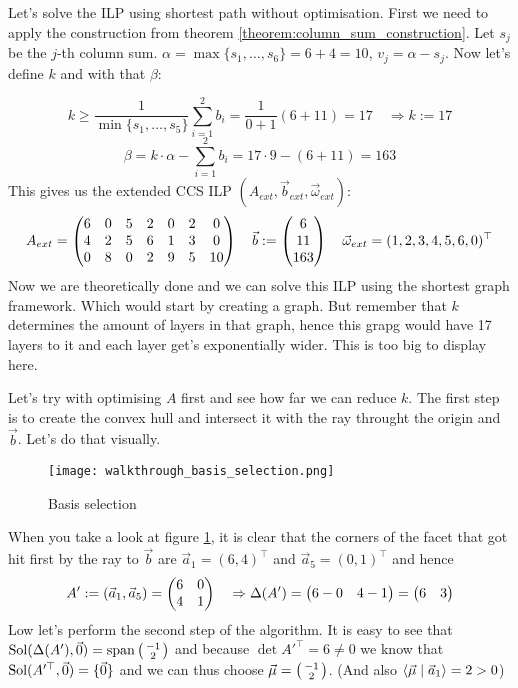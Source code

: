 Let's solve the ILP using shortest path without optimisation. First we need to apply the construction from theorem \ref{theorem:column_sum_construction}. Let $s_j$ be the $j$-th column sum. $\alpha = \max\{s_1, \dots, s_6\} = 6+4=10$, $v_j = \alpha - s_j$. Now let's define $k$ and with that $\beta$:

$$k \geq \frac{1}{\min\{s_1, \dots, s_5\}} \sum_{i=1}^{2}b_i = \frac{1}{0+1}(6+11) = 17 \quad \Rightarrow k := 17$$ 
$$\beta = k\cdot\alpha - \sum_{i=1}^{2}b_i = 17\cdot9-(6+11) = 163$$
This gives us the extended CCS ILP $(A_{ext}, \vec b_{ext}, \vec\omega_{ext})$:
$$A_{ext} = \left(\begin{matrix}6&0&5&2&0&2&0\\4&2&5&6&1&3&0\\0&8&0&2&9&5&10\end{matrix}\right)\quad\vec b:= \left(\begin{matrix}6\\11\\163\end{matrix}\right)\quad \vec\omega_{ext} = (1, 2, 3, 4, 5, 6, 0)^\top$$
Now we are theoretically done and we can solve this ILP using the shortest graph framework. Which would start by creating a graph. But remember that $k$ determines the amount of layers in that graph, hence this grapg would have 17 layers to it and each layer get's exponentially wider. This is too big to display here. 

Let's try with optimising $A$ first and see how far we can reduce $k$. The first step is to create the convex hull and intersect it with the ray throught the origin and $\vec b$. Let's do that visually. 
\begin{figure}
    \centering
    \texttt{[image: walkthrough\_basis\_selection.png]}
    \caption{\label{fig:walkthrough_basis_selection} Basis selection }
\end{figure}
When you take a look at figure \ref{fig:walkthrough_basis_selection}, it is clear that the corners of the facet that got hit first by the ray to $\vec b$ are $\vec a_1 = (6, 4)^\top$ and $\vec a_5 = (0, 1)^\top$ and hence
$$A' := (\vec a_1, \vec a_5) = \left(\begin{matrix}6&0\\4&1\end{matrix}\right) \quad \Rightarrow \Delta(A') = \left(\begin{matrix}6-0&4-1\end{matrix}\right) = \left(\begin{matrix}6&3\end{matrix}\right)$$
Low let's perform the second step of the algorithm. It is easy to see that $\operatorname{Sol}(\Delta(A'), \vec 0) = \operatorname{span}\left(\begin{smallmatrix}-1\\2\end{smallmatrix}\right)$ and because $\det A'^\top = 6 \neq 0$ we know that $\operatorname{Sol}(A'^\top, \vec 0) = \{\vec 0\}$ and we can thus choose $\vec\mu = \left(\begin{smallmatrix}-1\\2\end{smallmatrix}\right)$. (And also $\langle \vec\mu \mid \vec a_1 \rangle = 2 > 0$)

